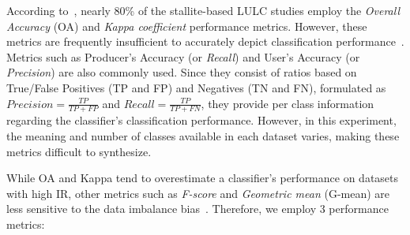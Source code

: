 \documentclass[parskip=full]{scrartcl}
\begin{document}
According to~\cite{Gavade2019}, nearly 80\% of the stallite-based LULC studies
employ the \textit{Overall Accuracy} (OA) and \textit{Kappa coefficient}
performance metrics. However, these metrics are frequently insufficient to
accurately depict classification performance~\cite{Olofsson2013, Pontius2011}.
Metrics such as Producer's Accuracy (or \textit{Recall}) and User's Accuracy (or
\textit{Precision}) are also commonly used. Since they consist of ratios based on
True/False Positives (TP and FP) and Negatives (TN and FN), formulated as
$Precision = \frac{TP}{TP+FP}$ and $Recall = \frac{TP}{TP+FN}$, they provide per
class information regarding the classifier's classification performance.
However, in this experiment, the meaning and number of classes available in each
dataset varies, making these metrics difficult to synthesize.

While OA and Kappa tend to overestimate a classifier's performance on datasets
with high IR, other metrics such as \textit{F-score} and \textit{Geometric mean}
(G-mean) are less sensitive to the data imbalance bias~\cite{Jeni2013,
Kubat1997}. Therefore, we employ 3 performance metrics:
\end{document}
